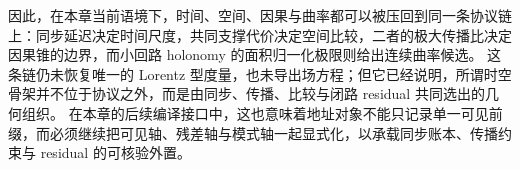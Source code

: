 \noindent
因此，在本章当前语境下，时间、空间、因果与曲率都可以被压回到同一条协议链上：同步延迟决定时间尺度，共同支撑代价决定空间比较，二者的极大传播比决定因果锥的边界，而小回路 holonomy 的面积归一化极限则给出连续曲率候选。
这条链仍未恢复唯一的 Lorentz 型度量，也未导出场方程；但它已经说明，所谓时空骨架并不位于协议之外，而是由同步、传播、比较与闭路 residual 共同选出的几何组织。
在本章的后续编译接口中，这也意味着地址对象不能只记录单一可见前缀，而必须继续把可见轴、残差轴与模式轴一起显式化，以承载同步账本、传播约束与 residual 的可核验外置。

\endinput
